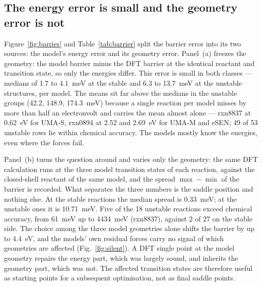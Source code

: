 \subsection{The energy error is small and the geometry error is not}
Figure~\ref{fig:barrier} and Table~\ref{tab:barrier} split the barrier error
into its two sources: the model's energy error and its geometry error.
Panel~(a) freezes the geometry: the model barrier minus the DFT barrier at
the identical reactant and transition state, so only the energies differ.
This error is small in both classes --- medians of 1.7 to 4.1~meV at the
stable and 6.3 to 13.7~meV at the unstable structures, per model.
The means sit far above the medians in the unstable groups (42.2, 148.9,
174.3~meV) because a single reaction per model misses by more than half an
electronvolt and carries the mean almost alone --- rxn8837 at 0.62~eV for
UMA-S, rxn0894 at 2.52 and 2.69~eV for UMA-M and eSEN; 49 of 53 unstable
rows lie within chemical accuracy.
The models mostly know the energies, even where the forces fail.

Panel~(b) turns the question around and varies only the geometry: the same
DFT calculation runs at the three model transition states of each reaction,
against the closed-shell reactant of the same model, and the spread
$\max - \min$ of the barrier is recorded.
What separates the three numbers is the saddle position and nothing else.
At the stable reactions the median spread is 0.33~meV; at the unstable ones
it is 10.71~meV.
Five of the 18 unstable reactions exceed chemical accuracy, from 61~meV up to
4434~meV (rxn8837), against 2 of 27 on the stable side.
The choice among the three model geometries alone shifts the barrier by up to
4.4~eV, and the models' own residual forces carry no signal of which
geometries are affected (Fig.~\ref{fig:silent}).
A DFT single point at the model geometry repairs the energy part, which was
largely sound, and inherits the geometry part, which was not.
The affected transition states are therefore useful as starting points for a
subsequent optimisation, not as final saddle points.

